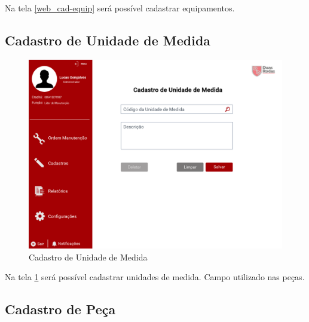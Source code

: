 Na tela \ref{web_cad-equip} será possível cadastrar equipamentos.

\newpage
\subsection{Cadastro de Unidade de Medida}

\begin{figure}[htb]
	\caption{\label{web_cad-uni-med}Cadastro de Unidade de Medida}
	\begin{center}
		\includegraphics[scale=0.55]{./Figuras/web/cad-uni-med.png}
	\end{center}
\end{figure}

Na tela \ref{web_cad-uni-med} será possível cadastrar unidades de medida. Campo utilizado nas peças.

\newpage
\subsection{Cadastro de Peça}

